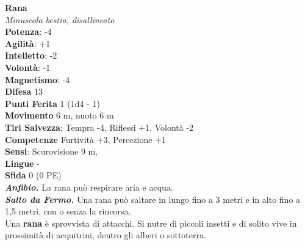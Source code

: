 \begin{multicols}{2}
\medskip\textbf{Rana}\\
\emph{Minuscola bestia, disallineato}\\
\textbf{Potenza}: -4\\
\textbf{Agilità}: +1\\
\textbf{Intelletto}: -2\\
\textbf{Volontà}: -1\\
\textbf{Magnetismo}: -4\\
\textbf{Difesa} 13\\
\textbf{Punti Ferita} 1 (1d4 - 1)\\
\textbf{Movimento} 6 m, nuoto 6 m\\
\textbf{Tiri Salvezza}:  Tempra -4, Riflessi +1, Volontà -2 \\
\textbf{Competenze} Furtività +3, Percezione +1\\
\textbf{Sensi}: Scurovisione 9 m, \\
\textbf{Lingue} -\\
\textbf{Sfida} 0 (0 PE)\smallskip\\
\emph{\textbf{Anfibio.}} La rana può respirare aria e acqua.\\
\emph{\textbf{Salto da Fermo.}} Una rana può saltare in lungo fino a 3 metri e in alto fino a 1,5 metri, con o senza la rincorsa.\\
Una \textbf{rana} è sprovvista di attacchi. Si nutre di piccoli insetti e di solito vive in prossimità di acquitrini, dentro gli alberi o sottoterra.\\


\end{multicols}
